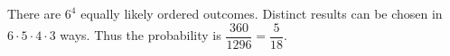 There are $6^4$ equally likely ordered outcomes. Distinct results can be chosen in $6\cdot5\cdot4\cdot3$ ways. Thus the probability is $\dfrac{360}{1296}=\boxed{\dfrac{5}{18}}$.
